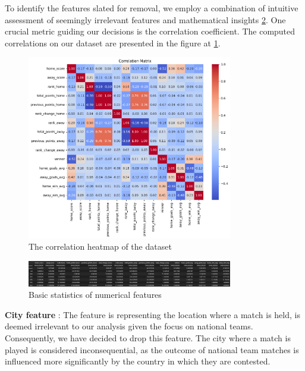 \documentclass[a4paper,12pt]{article}
\begin{document}
To identify the features slated for removal, we employ a combination of intuitive assessment of seemingly irrelevant features and mathematical insights \ref{fig:stats}. One crucial metric guiding our decisions is the correlation coefficient. The computed correlations on our dataset are presented in the figure at \ref{fig:corr_hm}.\\

\begin{figure}
  \centering
  \includegraphics[width=0.8\textwidth]{./images/correlation_rera.png}  %
  \caption{The correlation heatmap of the dataset}
  \label{fig:corr_hm}
\end{figure}

\begin{figure}
  \centering
  \includegraphics[width=0.8\textwidth]{./images/basic_stats_numerical_features.png}
  \caption{Basic statistics of numerical features}
  \label{fig:stats}
\end{figure}


{\bf City feature} : The feature is representing the location where a match is held, is deemed irrelevant to our analysis given the focus on national teams. Consequently, we have decided to drop this feature. The city where a match is played is considered inconsequential, as the outcome of national team matches is influenced more significantly by the country in which they are contested.\\
\end{document}
